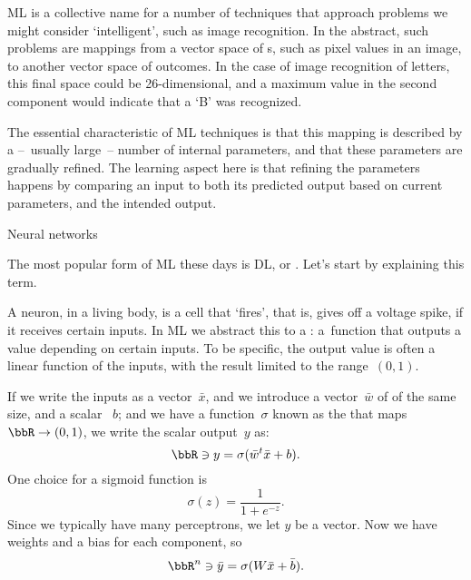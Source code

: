 

\acf{ML} is a collective name for a number of techniques that
approach problems we might consider `intelligent', such as image
recognition. In the abstract, such problems are mappings from a vector
space of s, such as pixel values in an image, to
another vector space of outcomes. In the case of image recognition of
letters, this final space could be 26-dimensional, and a maximum value
in the second component would indicate that a `B' was recognized.

The essential characteristic of \ac{ML} techniques is that
this mapping is described by a --~usually large~-- number of internal
parameters, and that these parameters are gradually refined. The
learning aspect here is that refining the parameters happens by
comparing an input to both its predicted output based on current
parameters, and the intended output.

 {Neural networks}


The most popular form of \ac{ML} these days is \acf{DL}, or
. Let's start by explaining this term.

A neuron, in a living body, is a cell that `fires', that is, gives off
a voltage spike, if it receives certain inputs. In \ac{ML} we abstract
this to a : a~function that outputs a value
depending on certain inputs. To be specific, the output value is often
a linear function of the inputs, with the result
limited to the range~$(0,1)$.

If we write the inputs as a vector~$\bar x$, and we introduce a vector~$\bar w$
of  of the same size, and a scalar ~$b$;
and we have a function~$\sigma$ known as the
 that maps $\bbR\rightarrow(0,1)$, we write the
scalar output~$y$ as:
\[ \bbR\owns y = \sigma( \bar w^t\bar x+b ). \]
One choice for a sigmoid function is
\[ \sigma(z) = \frac{1}{1+e^{-z}}. \]
Since we typically have many perceptrons, we let $y$ be a vector.
Now we have weights and a bias for each component, so
\[ \bbR^n\owns \bar y = \sigma( W\bar x + \bar b ). \]

